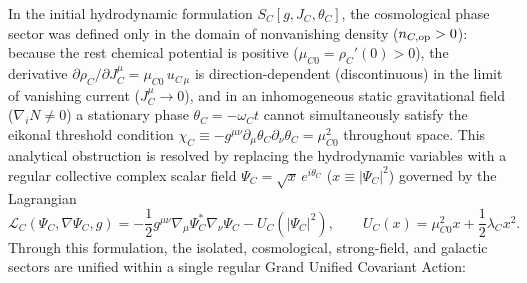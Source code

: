 \documentclass[11pt,a4paper]{article}
\begin{document}
In the initial hydrodynamic formulation $S_C[g, J_C, \theta_C]$, the cosmological phase sector was defined only in the domain of nonvanishing density ($n_{C,{\rm op}} > 0$): because the rest chemical potential is positive ($\mu_{C0} = \rho_C'(0) > 0$), the derivative $\partial\rho_C/\partial J_C^\mu = \mu_{C0}\,u_{C\,\mu}$ is direction-dependent (discontinuous) in the limit of vanishing current ($J_C^\mu \to 0$), and in an inhomogeneous static gravitational field ($\nabla_i N \neq 0$) a stationary phase $\theta_C = -\omega_C t$ cannot simultaneously satisfy the eikonal threshold condition $\chi_C \equiv -g^{\mu\nu}\partial_\mu\theta_C\partial_\nu\theta_C = \mu_{C0}^2$ throughout space. This analytical obstruction is resolved by replacing the hydrodynamic variables with a regular collective complex scalar field $\Psi_C = \sqrt{x}\,e^{i\theta_C}$ ($x \equiv |\Psi_C|^2$) governed by the Lagrangian
\begin{equation}
\mathcal{L}_C(\Psi_C,\nabla\Psi_C,g) = -\frac{1}{2}g^{\mu\nu}\nabla_\mu\Psi_C^*\nabla_\nu\Psi_C - U_C(|\Psi_C|^2), \qquad U_C(x) = \mu_{C0}^2 x + \frac{1}{2}\lambda_C x^2.
\end{equation}
Through this formulation, the isolated, cosmological, strong-field, and galactic sectors are unified within a single regular Grand Unified Covariant Action:
\end{document}
